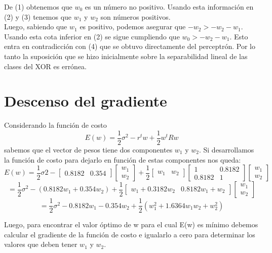 \documentclass[a4paper]{article}
\begin{document}
De (1) obtenemos que $w_{0}$ es un número no positivo. Usando esta información en (2) y (3) tenemos que $w_{1}$ y $w_{2}$ son números positivos. \\

Luego, sabiendo que $w_{1}$ es positivo, podemos asegurar que $-w_{2} > -w_{2} -w_{1}$. Usando esta cota inferior en (2) se sigue cumpliendo que $w_{0} > -w_{2} - w_{1}$. Esto entra en contradicción con (4) que se obtuvo directamente del perceptrón. Por lo tanto la suposición que se hizo inicialmente sobre la separabilidad lineal de las clases del XOR es errónea.

\section{Descenso del gradiente}
Considerando la función de costo $$E(w) = \frac{1}{2}\sigma^{2} - r^{t}w + \frac{1}{2}w^{t}Rw$$ sabemos que el vector de pesos tiene dos componentes $w_{1}$ y $w_{2}$. Si desarrollamos la función de costo para dejarlo en función de estas componentes nos queda:
$$E(w) = \frac{1}{2}\sigma{2} - \left[\begin{array}{cc}
0.8182 & 0.354\end{array}\right]\left[\begin{array}{c}
w_{1}
\\
w_{2}
\end{array}\right] + \frac{1}{2}\left[\begin{array}{cc}
w_{1} & w_{2}\end{array}\right]\left[\begin{array}{cc}
1 & 0.8182\\
0.8182 & 1
\end{array}\right] \left[\begin{array}{c}
w_{1}
\\
w_{2}
\end{array}\right]$$
$$= \frac{1}{2}\sigma^{2} - (0.8182w_{1}+0.354w_{2}) + \frac{1}{2}\left[\begin{array}{cc}
w_{1} + 0.3182w_{2} & 0.8182w_{1} + w_{2}
\end{array}\right]\left[\begin{array}{c}
w_{1}
\\
w_{2}
\end{array}\right]$$
$$= \frac{1}{2}\sigma^{2} - 0.8182w_{1} -0.354w_{2} + \frac{1}{2}(w_{1}^{2} + 1.6364w_{1}w_{2} + w_{2}^{2})$$

Luego, para encontrar el valor óptimo de w para el cual E(w) es mínimo debemos calcular el gradiente de la función de costo e igualarlo a cero para determinar los valores que deben tener $w_{1}$ y $w_{2}$.
\end{document}

